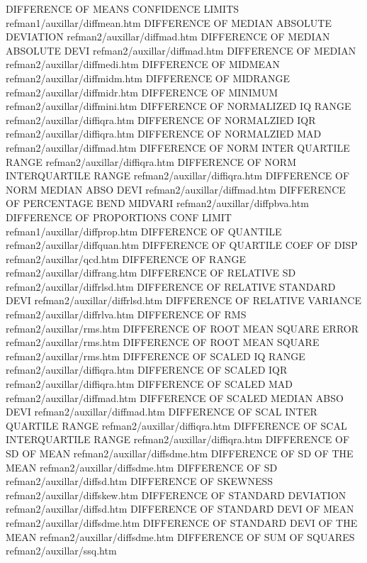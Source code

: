 DIFFERENCE OF MEANS CONFIDENCE LIMITS   refman1/auxillar/diffmean.htm
DIFFERENCE OF MEDIAN ABSOLUTE DEVIATION refman2/auxillar/diffmad.htm
DIFFERENCE OF MEDIAN ABSOLUTE DEVI      refman2/auxillar/diffmad.htm
DIFFERENCE OF MEDIAN                    refman2/auxillar/diffmedi.htm
DIFFERENCE OF MIDMEAN                   refman2/auxillar/diffmidm.htm
DIFFERENCE OF MIDRANGE                  refman2/auxillar/diffmidr.htm
DIFFERENCE OF MINIMUM                   refman2/auxillar/diffmini.htm
DIFFERENCE OF NORMALIZED IQ RANGE       refman2/auxillar/diffiqra.htm
DIFFERENCE OF NORMALZIED IQR            refman2/auxillar/diffiqra.htm
DIFFERENCE OF NORMALZIED MAD            refman2/auxillar/diffmad.htm
DIFFERENCE OF NORM INTER QUARTILE RANGE refman2/auxillar/diffiqra.htm
DIFFERENCE OF NORM INTERQUARTILE RANGE  refman2/auxillar/diffiqra.htm
DIFFERENCE OF NORM MEDIAN ABSO DEVI     refman2/auxillar/diffmad.htm
DIFFERENCE OF PERCENTAGE BEND MIDVARI   refman2/auxillar/diffpbva.htm
DIFFERENCE OF PROPORTIONS CONF LIMIT    refman1/auxillar/diffprop.htm
DIFFERENCE OF QUANTILE                  refman2/auxillar/diffquan.htm
DIFFERENCE OF QUARTILE COEF OF DISP     refman2/auxillar/qcd.htm
DIFFERENCE OF RANGE                     refman2/auxillar/diffrang.htm
DIFFERENCE OF RELATIVE SD               refman2/auxillar/diffrlsd.htm
DIFFERENCE OF RELATIVE STANDARD DEVI    refman2/auxillar/diffrlsd.htm
DIFFERENCE OF RELATIVE VARIANCE         refman2/auxillar/diffrlva.htm
DIFFERENCE OF RMS                       refman2/auxillar/rms.htm
DIFFERENCE OF ROOT MEAN SQUARE ERROR    refman2/auxillar/rms.htm
DIFFERENCE OF ROOT MEAN SQUARE          refman2/auxillar/rms.htm
DIFFERENCE OF SCALED IQ RANGE           refman2/auxillar/diffiqra.htm
DIFFERENCE OF SCALED IQR                refman2/auxillar/diffiqra.htm
DIFFERENCE OF SCALED MAD                refman2/auxillar/diffmad.htm
DIFFERENCE OF SCALED MEDIAN ABSO DEVI   refman2/auxillar/diffmad.htm
DIFFERENCE OF SCAL INTER QUARTILE RANGE refman2/auxillar/diffiqra.htm
DIFFERENCE OF SCAL INTERQUARTILE RANGE  refman2/auxillar/diffiqra.htm
DIFFERENCE OF SD OF MEAN                refman2/auxillar/diffsdme.htm
DIFFERENCE OF SD OF THE MEAN            refman2/auxillar/diffsdme.htm
DIFFERENCE OF SD                        refman2/auxillar/diffsd.htm
DIFFERENCE OF SKEWNESS                  refman2/auxillar/diffskew.htm
DIFFERENCE OF STANDARD DEVIATION        refman2/auxillar/diffsd.htm
DIFFERENCE OF STANDARD DEVI OF MEAN     refman2/auxillar/diffsdme.htm
DIFFERENCE OF STANDARD DEVI OF THE MEAN refman2/auxillar/diffsdme.htm
DIFFERENCE OF SUM OF SQUARES            refman2/auxillar/ssq.htm
